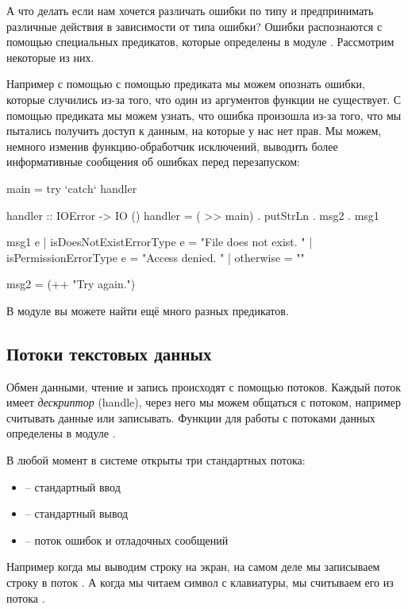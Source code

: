 А что делать если нам хочется различать ошибки по типу
и предпринимать различные действия в зависимости от
типа ошибки? 
Ошибки распознаются с помощью специальных предикатов, 
которые определены в модуле .
Рассмотрим некоторые из них.

Например с помощью с помощью предиката 
мы можем опознать ошибки, которые случились из-за того, что
один из аргументов функции не существует. С помощью предиката
 мы можем узнать, что ошибка произошла
из-за того, что мы пытались получить доступ к данным, на
которые у нас нет прав. Мы можем, немного изменив 
функцию-обработчик исключений, выводить более информативные
сообщения об ошибках перед перезапуском:


\begin{code}
main = try `catch` handler

handler :: IOError -> IO ()
handler = ( >> main) . putStrLn . msg2 . msg1

msg1 e 
    | isDoesNotExistErrorType e = "File does not exist. "
    | isPermissionErrorType e   = "Access denied. "
    | otherwise                 = ""

msg2 = (++ "Try again.")
\end{code}

В модуле  вы можете найти ещё много
разных предикатов. 

\subsection{Потоки текстовых данных}

Обмен данными, чтение и запись происходят с помощью
потоков. Каждый поток имеет \emph{дескриптор} (handle),
через него мы можем общаться с потоком, например считывать 
данные или записывать. Функции для работы с потоками 
данных определены в модуле . 

В любой момент в системе открыты три стандартных потока:
\begin{itemize}
\item {}   -- стандартный ввод
\item {}  -- стандартный вывод
\item {}  -- поток ошибок и отладочных сообщений
\end{itemize}

Например когда мы выводим строку на экран, на самом деле
мы записываем строку в поток . А когда мы читаем
символ с клавиатуры, мы считываем его из потока .

